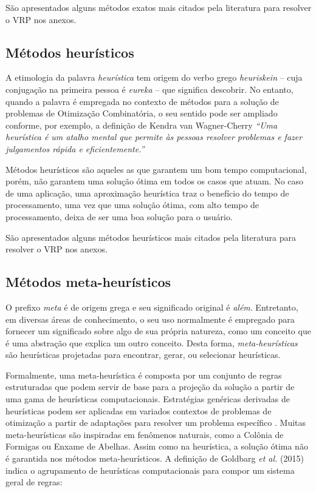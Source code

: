 São apresentados alguns métodos exatos mais citados pela literatura para resolver o VRP nos anexos.

\subsection{Métodos heurísticos}\label{heuristica}
A etimologia da palavra \emph{heurística} tem origem do verbo grego \emph{heuriskein} -- cuja conjugação na primeira pessoa é \emph{eureka} -- que significa descobrir. No entanto, quando a palavra é empregada no contexto de métodos para a solução de problemas de Otimização Combinatória, o seu sentido pode ser ampliado conforme, por exemplo, a definição de Kendra van Wagner-Cherry \emph{``Uma heurística é um atalho mental que permite às pessoas resolver problemas e fazer julgamentos rápida e eficientemente.''} \cite{goldbarg}


Métodos heurísticos são aqueles as que garantem um bom tempo computacional, porém, não garantem uma solução ótima em todos os casos que atuam. No caso de uma aplicação, uma aproximação heurística traz o benefício do tempo de processamento, uma vez que uma solução ótima, com alto tempo de processamento, deixa de ser uma boa solução para o usuário. 

São apresentados alguns métodos heurísticos mais citados pela literatura para resolver o VRP nos anexos.

\subsection{Métodos meta-heurísticos}\label{metaheuristica}
O prefixo \emph{meta} é de origem grega e seu significado original é \emph{além}. Entretanto, em diversas áreas de conhecimento, o seu uso normalmente é empregado para fornecer um significado sobre algo de sua própria natureza, como um conceito que é uma abstração que explica um outro conceito. Desta forma, \emph{meta-heurísticas} são heurísticas projetadas para encontrar, gerar, ou selecionar heurísticas.

Formalmente, uma meta-heurística é composta por um conjunto de regras estruturadas que podem servir de base para a projeção da solução a partir de uma gama de heurísticas computacionais. Estratégias genéricas derivadas de heurísticas  podem ser aplicadas em variados contextos de problemas de otimização a partir de adaptações para resolver um problema específico \cite{maxwell}. Muitas meta-heurísticas são inspiradas em fenômenos naturais, como a Colônia de Formigas ou Enxame de Abelhas. Assim como na heurística, a solução ótima não é garantida nos métodos meta-heurísticos. A definição de Goldbarg \emph{et al.} (2015) indica o agrupamento de heurísticas computacionais para compor um sistema geral de regras: 

